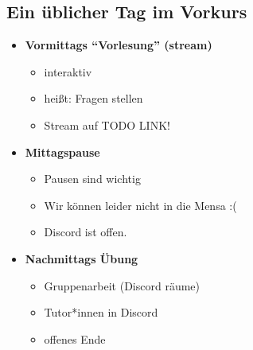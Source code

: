\subsection{Ein üblicher Tag im Vorkurs}
\begin{frame}
	\slidehead
	\begin{itemize}
		\item \textbf{Vormittags "`Vorlesung"' (stream)}
		\begin{itemize}
			\item interaktiv
			\item heißt: Fragen stellen
			\item Stream auf TODO LINK!
		\end{itemize}
		\item \textbf{Mittagspause}
		\begin{itemize}
			\item Pausen sind wichtig
			\item Wir können leider nicht in die Mensa :(
			\item Discord ist offen.
		\end{itemize}
		\item \textbf{Nachmittags Übung}
		\begin{itemize}
			\item Gruppenarbeit (Discord räume)
			\item Tutor*innen in Discord
			\item offenes Ende
		\end{itemize}
	\end{itemize}
\end{frame}

